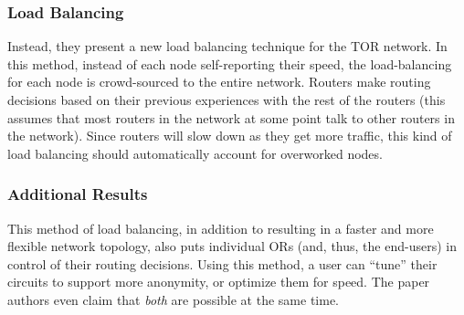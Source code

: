 \documentclass[letterpaper, titlepage, 12pt]{article}
\begin{document}
\subsubsection{Load Balancing}

Instead, they present a new load balancing technique for the TOR network. In this method, instead of each node self-reporting their speed, the load-balancing for each node is crowd-sourced to the entire network. Routers make routing decisions based on their previous experiences with the rest of the routers (this assumes that most routers in the network at some point talk to other routers in the network). Since routers will slow down as they get more traffic, this kind of load balancing should automatically account for overworked nodes\cite{5560675}.

\subsubsection{Additional Results}

This method of load balancing, in addition to resulting in a faster and more flexible network topology, also puts individual ORs (and, thus, the end-users) in control of their routing decisions. Using this method, a user can ``tune'' their circuits to support more anonymity, or optimize them for speed. The paper authors even claim that \emph{both} are possible at the same time.
\newpage
\printbibliography
\end{document}
